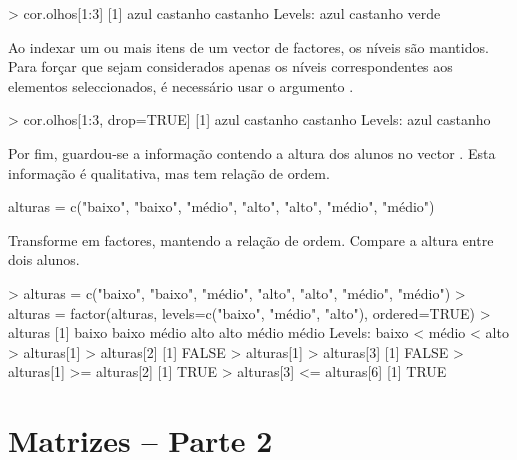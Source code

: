 \documentclass{exam}
\begin{document}
\begin{questions}
\begin{solution}
	\begin{rcode}
		> cor.olhos[1:3]
		[1] azul     castanho castanho
		Levels: azul castanho verde
	\end{rcode}
	Ao indexar um ou mais itens de um vector de factores, os níveis são mantidos. Para forçar que sejam considerados apenas os níveis correspondentes aos elementos seleccionados, é necessário usar o argumento .
	\begin{rcode}
		> cor.olhos[1:3, drop=TRUE]
		[1] azul     castanho castanho
		Levels: azul castanho
	\end{rcode}
\end{solution}

\question Por fim, guardou-se a informação contendo a altura dos alunos no vector . Esta informação é qualitativa, mas tem relação de ordem.
\begin{rcode}
	alturas = c("baixo", "baixo", "médio", "alto", "alto", "médio", "médio")
\end{rcode}
Transforme em factores, mantendo a relação de ordem. Compare a altura entre dois alunos.

\begin{solution}
	\begin{rcode}
		> alturas = c("baixo", "baixo", "médio", "alto", "alto", "médio", "médio")
		> alturas = factor(alturas, levels=c("baixo", "médio", "alto"), ordered=TRUE)
		> alturas
		[1] baixo baixo médio alto  alto  médio médio
		Levels: baixo < médio < alto
		> alturas[1] > alturas[2]
		[1] FALSE
		> alturas[1] > alturas[3]
		[1] FALSE
		> alturas[1] >= alturas[2]
		[1] TRUE
		> alturas[3] <= alturas[6]
		[1] TRUE
	\end{rcode}
\end{solution}

\end{questions}

\section{Matrizes -- Parte 2}
\label{matrizes}
\end{document}
